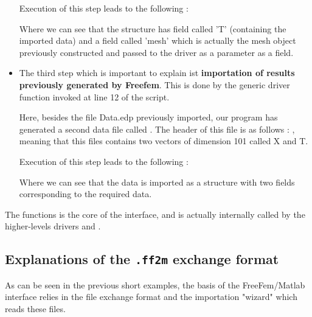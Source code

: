 \begin{itemize}
Execution of this step leads to the following :


Where we can see that the structure has field called 'T' (containing the imported data)
 and a field called 'mesh'  which is actually the mesh object previously constructed and passed to the driver as a parameter as a field.


\item The third step which is important to explain ist {\bf importation of results previously generated by Freefem}. 
This is done by the generic driver function  invoked at line 12 of the script. 

Here, besides the file Data.edp previously imported, our program has generated a second data file called .
The header of this file is as follows :
, 
meaning that this files contains two vectors of dimension 101 called X and T.


Execution of this step leads to the following :



Where we can see that the data is imported as a structure with two fields corresponding to the required data.

\end{itemize}

The  functions is the core of the interface, and is actually internally called by the higher-levels drivers   and .

 


%


%

\subsection{Explanations of the \texttt{.ff2m} exchange format}


As can be seen in the previous short examples, the basis of the FreeFem/Matlab interface relies in the file exchange format 
and the importation "wizard"   which reads these files.

